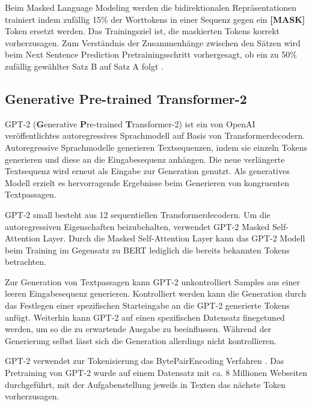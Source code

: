 Beim Masked Language Modeling werden die bidirektionalen Repräsentationen trainiert indem zufällig 15\% der Worttokens in einer Sequenz gegen ein \textbf{[MASK]} Token ersetzt werden. Das Trainingsziel ist, die maskierten Tokens korrekt vorherzusagen.
Zum Verständnis der Zusammenhänge zwischen den Sätzen wird beim Next Sentence Prediction Pretrainingsschritt vorhergesagt, ob ein zu 50\% zufällig gewählter Satz B auf Satz A folgt \citep{DBLP:journals/corr/abs-1810-04805}.

\pagebreak
\subsection{\textbf{G}enerative \textbf{P}re-trained \textbf{T}ransformer-2}
GPT-2 (\textbf{G}enerative \textbf{P}re-trained \textbf{T}ransformer-2) ist ein von OpenAI \citep{radford2019language} veröffentlichtes autoregressives Sprachmodell auf Basis von Transformerdecodern.
Autoregressive Sprachmodelle generieren Textsequenzen, indem sie einzeln Tokens generieren und diese an die Eingabesequenz anhängen. Die neue verlängerte Textsequenz wird erneut als Eingabe zur Generation genutzt.
Als generatives Modell erzielt es hervorragende Ergebnisse beim Generieren von kongruenten Textpassagen.

GPT-2 small besteht aus 12 sequentiellen Transformerdecodern.
Um die autoregressiven Eigenschaften beizubehalten, verwendet GPT-2 Masked Self-Attention Layer. 
Durch die Masked Self-Attention Layer kann das GPT-2 Modell beim Training im Gegensatz zu BERT lediglich die bereits bekannten Tokens betrachten.

Zur Generation von Textpassagen kann GPT-2 unkontrolliert Samples aus einer leeren Eingabesequenz generieren.
Kontrolliert werden kann die Generation durch das Festlegen einer spezifischen Starteingabe an die GPT-2 generierte Tokens anfügt.
Weiterhin kann GPT-2 auf einen spezifischen Datensatz finegetuned werden, um so die zu erwartende Ausgabe zu beeinflussen.
Während der Generierung selbst lässt sich die Generation allerdings nicht kontrollieren.

GPT-2 verwendet zur Tokenisierung das BytePairEncoding Verfahren \citep{bytepairencoding}.
Das Pretraining von GPT-2 wurde auf einem Datensatz mit ca. 8 Millionen Webseiten durchgeführt, mit der Aufgabenstellung jeweils in Texten das nächste Token vorherzusagen.



\pagebreak
